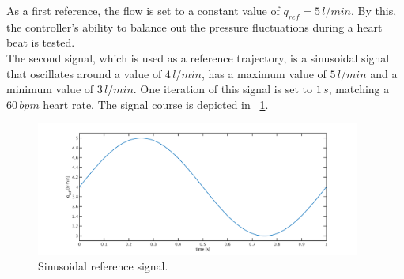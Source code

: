 As a first reference, the flow is set to a constant value of $q_{ref}=5\,l/min$. By this, the controller's ability to balance out the pressure fluctuations during a heart beat is tested.
\\The second signal, which is used as a reference trajectory, is a sinusoidal signal that oscillates around a value of $4\, l/min$, has a maximum value of $5\, l/min$ and a minimum value of $3\, l/min$. One iteration of this signal is set to $1\,s$, matching a $60\,bpm$ heart rate. The signal course is depicted in \figurename~\ref{fig:ref_sine}.
\begin{figure}[ht]
  \centering
  \includegraphics[width=0.95\textwidth]{images/chapt_5/ILC/ref_sine.pdf}
  \caption[Sinusoidal reference signal]{Sinusoidal reference signal.}
  \label{fig:ref_sine}
\end{figure}

